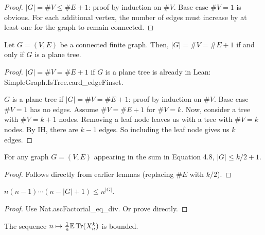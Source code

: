 \begin{proof}
  \notready
  $|G|= \#V\le \#E+1$: proof by induction on $\#V$. Base case $\#V = 1$ is obvious. For each additional vertex, the number of edges must increase by at least one for the graph to remain connected.
\end{proof}

\begin{proposition}
  \label{prop:vertex_edge_tree_equality}
  \notready
  Let $G=(V,E)$ be a connected finite graph. Then, $|G|=\#V=\#E+1$ if and only if $G$ is a plane tree.
\end{proposition}

\begin{proof}
  \notready
  $|G|=\#V=\#E+1$ if $G$ is a plane tree is already in Lean: SimpleGraph.IsTree.card\_edgeFinset.

  $G$ is a plane tree if $|G|=\#V=\#E+1$: proof by induction on $\#V$. Base case $\#V = 1$ has no edges. Assume $\#V = \#E + 1$ for $\#V = k$. Now, consider a tree with $\#V = k+1$ nodes. Removing a leaf node leaves us with a tree with $\#V = k$ nodes. By IH, there are $k - 1$ edges. So including the leaf node gives us $k$ edges.
\end{proof}


\begin{lemma}
  \label{lemma:vertex_bound}
  \notready
  For any graph $G = (V, E)$ appearing in the sum in Equation 4.8, $|G| \le k/2 + 1$.
\end{lemma}

\begin{proof}
  \notready
  Follows directly from earlier lemmas (replacing $\#E$ with $k/2$).
\end{proof}



\begin{lemma}
  \label{lemma:asc_factorial_product}
  \notready
  $n(n-1)\cdots (n-|G|+1) \le n^{|G|}$.

\end{lemma}

\begin{proof}
  \notready
  Use Nat.ascFactorial\_eq\_div. Or prove directly.
\end{proof}



\begin{lemma}
  \label{lemma:bounded_map}
  \notready
  The sequence $n\mapsto \frac1n\mathbb{E}\operatorname{Tr}(X_n^k)$ is bounded.
\end{lemma}

